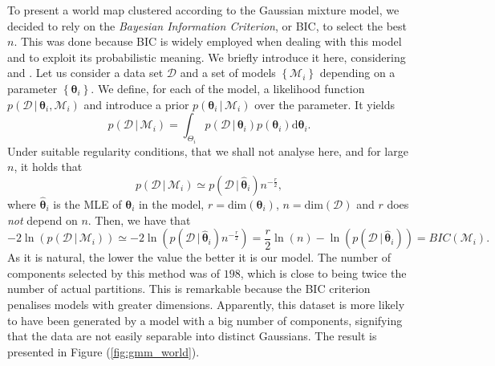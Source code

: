 \documentclass[a4paper]{article}
\begin{document}
 	To present a world map clustered according to the Gaussian mixture model, we decided to rely on the \textit{Bayesian Information Criterion}, or BIC, to select the best $n$. This was done because BIC is widely employed when dealing with this model and to exploit its probabilistic meaning. We briefly introduce it here, considering \cite{Bishop:2006} and \cite{Schwarz_1978}.
 	Let us consider a data set $\mathcal{D}$ and a set of models $\left\{\mathcal{M}_{i}\right\}$ depending on a parameter $\left\{\boldsymbol{\theta}_{i}\right\}$. We define, for each of the model, a likelihood function $p \left(\mathcal{D}\,|\,\boldsymbol{\theta}_{i}, \mathcal{M}_{i}\right)$ and introduce a prior $p \left( \boldsymbol{\theta}_{i} \,|\, \mathcal{M}_{i} \right) $ over the parameter. It yields
 	\begin{equation*}
 	p\left(\mathcal{D} \,|\, \mathcal{M}_{i} \right) = \int_{\Theta_{i}} p \left (\mathcal{D} \,|\, \boldsymbol{\theta}_{i}\right) p \left( \boldsymbol{\theta}_{i} \right) \mathrm{d}\boldsymbol{\theta}_{i}.
 	\end{equation*}
 	Under suitable regularity conditions, that we shall not analyse here, and for large $n$, it holds that
 	\begin{equation*}
 	p\left(\mathcal{D} \,|\, \mathcal{M}_{i} \right) \simeq p \left( \mathcal{D} \,|\, \hat{\boldsymbol{\theta}}_{i} \right) n^{-\frac{r}{2}},
 	\end{equation*}
 	where $\hat{\boldsymbol{\theta}}_{i}$ is the MLE of $\boldsymbol{\theta}_{i}$ in the model, $r = \mathrm{dim} (\boldsymbol{\theta}_{i})$, $n = \mathrm{dim} \left( \mathcal{D} \right)$ and $r$ does \textit{not} depend on $n$.
 	Then, we have that 
 	\begin{equation*}
 	-2\ln \left( 	p\left(\mathcal{D} \,|\, \mathcal{M}_{i} \right) \right) \simeq -2 \ln \left(  p \left( \mathcal{D} \,|\, \hat{\boldsymbol{\theta}}_{i} \right) n^{-\frac{r}{2}} \right) = \frac{r}{2} \ln (n) - \ln \left( p \left( \mathcal{D} \,|\, \hat{\boldsymbol{\theta}}_{i} \right) \right) = BIC\left( \mathcal{M}_{i} \right).
 	\end{equation*}
 	As it is natural, the lower the value the better it is our model.
 	The number of components selected by this method was of $198$, which is close to being twice the number of actual partitions. This is remarkable because the BIC criterion penalises models with greater dimensions. Apparently, this dataset is more likely to have been generated by a model with a big number of components, signifying that the data are not easily separable into distinct Gaussians.
 	The result is presented in Figure (\ref{fig:gmm_world}).
	
	
\end{document}
